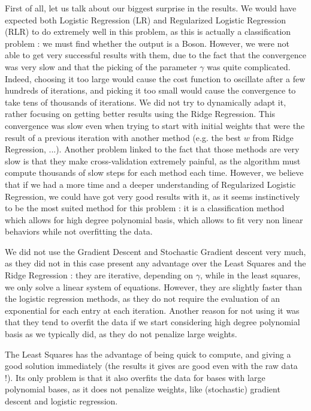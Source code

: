 \documentclass[10pt,conference,compsocconf]{IEEEtran}
\begin{document}
First of all, let us talk about our biggest surprise in the results. We would have expected both Logistic Regression (LR) and Regularized Logistic Regression (RLR) to do extremely well in this problem, as this is actually a classification problem : we must find whether the output is a Boson. However, we were not able to get very successful results with them, due to the fact that the convergence was very slow and that the picking of the parameter $\gamma$ was quite complicated.  Indeed, choosing it too large would cause the cost function to oscillate after a few hundreds of iterations, and picking it too small would cause the convergence to take tens of thousands of iterations. We did not try to dynamically adapt it, rather focusing on getting better results using the Ridge Regression. This convergence was slow even when trying to start with initial weights that were the result of a previous iteration with another method (e.g. the best $w$ from Ridge Regression, ...). Another problem linked to the fact that those methods are very slow is that they make cross-validation extremely painful, as the algorithm must compute thousands of slow steps for each method each time. However, we believe that if we had a more time and a deeper understanding of Regularized Logistic Regression, we could have got very good results with it, as it seems instinctively to be the most suited method for this problem : it is a classification method which allows for high degree polynomial basis, which allows to fit very non linear behaviors while not overfitting the data. 

We did not use the Gradient Descent and Stochastic Gradient descent very much, as they did not in this case present any advantage over the Least Squares and the Ridge Regression : they are iterative, depending on $\gamma$, while in the least squares, we only solve a linear system of equations. However, they are slightly faster than the logistic regression methods, as they do not require the evaluation of an exponential for each entry at each iteration. Another reason for not using it was that they tend to overfit the data if we start considering high degree polynomial basis as we typically did, as they do not penalize large weights.

The Least Squares has the advantage of being quick to compute, and giving a good solution immediately (the results it gives are good even with the raw data !). Its only problem is that it also overfits the data for bases with large polynomial bases, as it does not penalize weights, like (stochastic) gradient descent and logistic regression.
\end{document}
